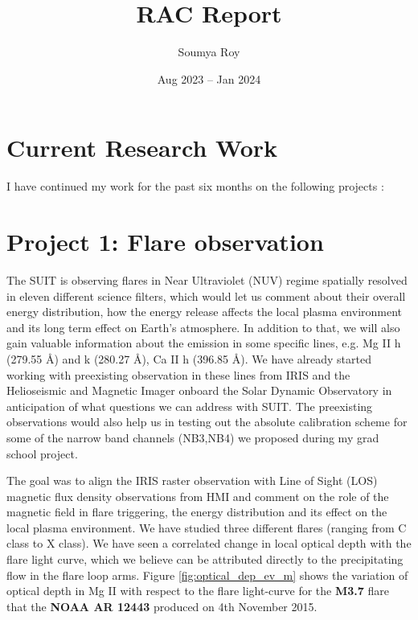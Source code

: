 \documentclass[a4paper,11pt]{article}
\title{RAC Report}
\author{Soumya Roy}
\date{Aug 2023 -- Jan 2024}
\begin{document}
\maketitle

\section{Current Research Work}
I have continued my work for the past six months on the following projects :

\section*{Project 1: Flare observation}\label{sec3}

The SUIT is observing flares in Near Ultraviolet (NUV) regime spatially resolved in eleven different science filters, which would let us comment about their overall energy distribution, how the energy release affects the local plasma environment and its long term effect on Earth's atmosphere. In addition to that, we will also gain valuable information about the emission in some specific lines, e.g. Mg II h (279.55 \AA) and k (280.27 \AA), Ca II h (396.85 \AA). We have already started working with preexisting observation in these lines from IRIS and the Helioseismic and Magnetic Imager \citep[HMI;][]{hmi} onboard the Solar Dynamic Observatory \citep[SDO;][]{sdo} in anticipation of what questions we can address with SUIT. The preexisting observations would also help us in testing out the absolute calibration scheme for some of the narrow band channels (NB3,NB4) we proposed during my grad school project.  

The goal was to align the IRIS raster observation with Line of Sight (LOS) magnetic flux density observations from HMI and comment on the role of the magnetic field in flare triggering, the energy distribution and its effect on the local plasma environment. We have studied three different flares (ranging from C class to X class). We have seen a correlated change in local optical depth with the flare light curve, which we believe can be attributed directly to the precipitating flow in the flare loop arms. Figure \ref{fig:optical_dep_ev_m} shows the variation of optical depth in Mg II with respect to the flare light-curve for the \textbf{M3.7} flare that the \textbf{NOAA AR 12443} produced on 4th November 2015. 
\end{document}
